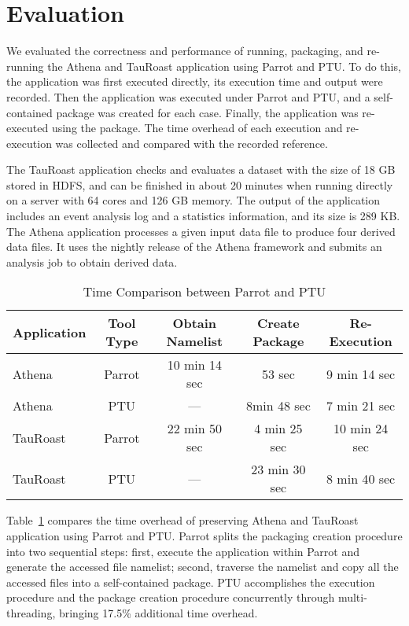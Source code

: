 \section{Evaluation}

We evaluated the correctness and performance of running, packaging, and re-running the Athena and TauRoast application using Parrot and PTU.
To do this, the application was first executed directly, its execution time and output were recorded. Then the application was executed under Parrot and PTU, and a self-contained package was created for each case. Finally, the application was re-executed using the package. The time overhead of each execution and re-execution was collected and compared with the recorded reference.

The TauRoast application checks and evaluates a dataset with the size of 18 GB stored in HDFS, and can be finished in about 20 minutes when running directly on a server with 64 cores and 126 GB memory. The output of the application includes an event analysis log and a statistics information, and its size is 289 KB. The Athena application processes a given input data file to produce four derived data files. It uses the nightly release of the Athena framework and 
submits an analysis job to obtain derived data.  

\begin{table}
\small
    \centering
    \begin{tabular}{lcccc}
    \hline
    \bf Application & \bf Tool Type & \bf Obtain Namelist & \bf Create Package & \bf Re-Execution \\ \hline
	Athena & Parrot & 10 min 14 sec & 53 sec & 9 min 14 sec \\ \hline
	Athena & PTU & --- & 8min 48 sec & 7 min 21 sec \\ \hline
	TauRoast & Parrot & 22 min 50 sec  & 4 min 25 sec & 10 min 24 sec \\ \hline
	TauRoast & PTU & --- & 23 min 30 sec & 8 min 40 sec \\ \hline 
    \end{tabular}
    \normalsize
    \caption{Time Comparison between Parrot and PTU}
    \label{table:parrot_ptu}
\end{table}    

Table~\ref{table:parrot_ptu} compares the time overhead of preserving Athena and TauRoast application using Parrot and PTU.
Parrot splits the packaging creation procedure into two sequential steps: first, execute the application within Parrot and generate the accessed file namelist; second, traverse the namelist and copy all the accessed files into a self-contained package.
PTU accomplishes the execution procedure and the package creation procedure concurrently through multi-threading, bringing 17.5\% additional time overhead.


